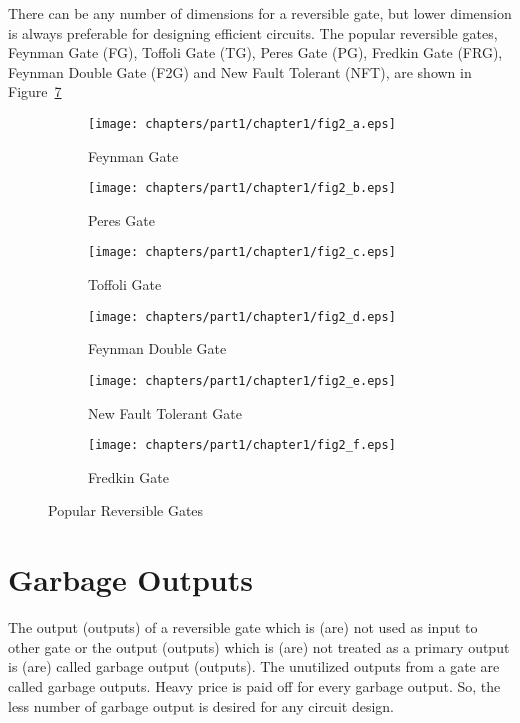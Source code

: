 \begin{example}\textnormal{
There can be any number of dimensions for a reversible gate, but lower dimension is always preferable for designing efficient circuits. The popular reversible gates, Feynman Gate (FG), Toffoli Gate (TG), Peres Gate (PG), Fredkin Gate (FRG), Feynman Double Gate (F2G) and New Fault Tolerant (NFT), are shown in Figure~\ref{fig:p1_c1_fig2}}
\end{example}
\begin{figure}[H]
\centering
\begin{subfigure}[b]{0.30\textwidth}
\centering
\texttt{[image: chapters/part1/chapter1/fig2\_a.eps]}
\caption{Feynman Gate}
\label{fig:p1_c1_fig2_a}
\end{subfigure}
\begin{subfigure}[b]{0.30\textwidth}
\centering
\texttt{[image: chapters/part1/chapter1/fig2\_b.eps]}
\caption{Peres Gate}
\label{fig:p2_c1_fig2_b}
\end{subfigure}
\begin{subfigure}[b]{0.30\textwidth}
\centering
\texttt{[image: chapters/part1/chapter1/fig2\_c.eps]}
\caption{Toffoli Gate}
\label{fig:p1_c1_fig2_c}
\end{subfigure}

\begin{subfigure}[b]{0.30\textwidth}
\centering
\texttt{[image: chapters/part1/chapter1/fig2\_d.eps]}
\caption{Feynman Double Gate}
\label{fig:p1_c1_fig2_d}
\end{subfigure}
\begin{subfigure}[b]{0.30\textwidth}
\centering
\texttt{[image: chapters/part1/chapter1/fig2\_e.eps]}
\caption{New Fault Tolerant Gate}
\label{fig:p1_c1_fig2_e}
\end{subfigure}
\begin{subfigure}[b]{0.30\textwidth}
\centering
\texttt{[image: chapters/part1/chapter1/fig2\_f.eps]}
\caption{Fredkin Gate}
\label{fig:p1_c1_fig2_f}
\end{subfigure}
\caption{Popular Reversible Gates}
\label{fig:p1_c1_fig2}
\end{figure}

\section{Garbage Outputs}

The output (outputs) of a reversible gate which is (are) not used as input to other gate or the output (outputs) which is (are) not treated as a primary output is (are) called garbage output (outputs). The unutilized outputs
from a gate are called garbage outputs. Heavy price is paid
oﬀ for every garbage output. So, the less number of garbage output is desired for any circuit design.


